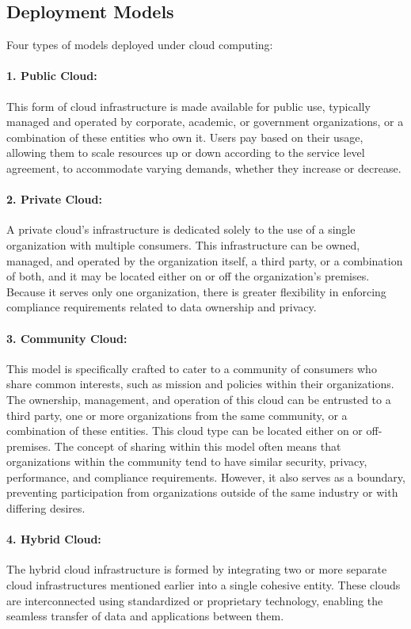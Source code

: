 \documentclass{article}
\begin{document}
\subsection{Deployment Models}
Four types of models deployed under cloud computing: 

\paragraph{1. Public Cloud:} This form of cloud infrastructure is made available for public use, typically managed and operated by corporate, academic, or government organizations, or a combination of these entities who own it. Users pay based on their usage, allowing them to scale resources up or down according to the service level agreement, to accommodate varying demands, whether they increase or decrease.

\paragraph{2. Private Cloud:}
A private cloud's infrastructure is dedicated solely to the use of a single organization with multiple consumers. This infrastructure can be owned, managed, and operated by the organization itself, a third party, or a combination of both, and it may be located either on or off the organization's premises. Because it serves only one organization, there is greater flexibility in enforcing compliance requirements related to data ownership and privacy.

\paragraph{3. Community Cloud:} This model is specifically crafted to cater to a community of consumers who share common interests, such as mission and policies within their organizations. The ownership, management, and operation of this cloud can be entrusted to a third party, one or more organizations from the same community, or a combination of these entities. This cloud type can be located either on or off-premises. The concept of sharing within this model often means that organizations within the community tend to have similar security, privacy, performance, and compliance requirements. However, it also serves as a boundary, preventing participation from organizations outside of the same industry or with differing desires.

\paragraph{4. Hybrid Cloud:} The hybrid cloud infrastructure is formed by integrating two or more separate cloud infrastructures mentioned earlier into a single cohesive entity. These clouds are interconnected using standardized or proprietary technology, enabling the seamless transfer of data and applications between them.
\end{document}
